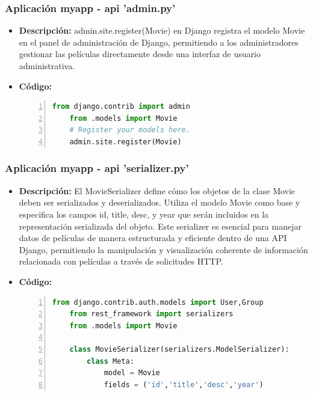 \documentclass{article}
\begin{document}
  \subsubsection{Aplicación myapp - api 'admin.py'}
  \begin{itemize}
    \item \textbf{Descripción: }admin.site.register(Movie) en Django registra el modelo Movie en el panel de 
    administración de Django, permitiendo a los administradores gestionar las películas directamente desde 
    una interfaz de usuario administrativa.
    \item \textbf{Código: }
    \begin{lstlisting}[language=python, numbers=left, firstnumber=1, numberstyle=\color{blue}]
    from django.contrib import admin
    from .models import Movie
    # Register your models here.
    admin.site.register(Movie)
    \end{lstlisting}
  \end{itemize}
  \subsubsection{Aplicación myapp - api 'serializer.py'}
  \begin{itemize}
    \item \textbf{Descripción: }El MovieSerializer define cómo los objetos de la clase Movie deben ser serializados 
    y deserializados. Utiliza el modelo Movie como base y especifica los campos id, title, desc, y year que serán 
    incluidos en la representación serializada del objeto. Este serializer es esencial para manejar datos de películas 
    de manera estructurada y eficiente dentro de una API Django, permitiendo la manipulación y visualización coherente 
    de información relacionada con películas a través de solicitudes HTTP.
    \item \textbf{Código: }
    \begin{lstlisting}[language=python, numbers=left, firstnumber=1, numberstyle=\color{blue}]
    from django.contrib.auth.models import User,Group
    from rest_framework import serializers
    from .models import Movie

    class MovieSerializer(serializers.ModelSerializer):
        class Meta:
            model = Movie
            fields = ('id','title','desc','year')
    \end{lstlisting}
  \end{itemize}
\end{document}
